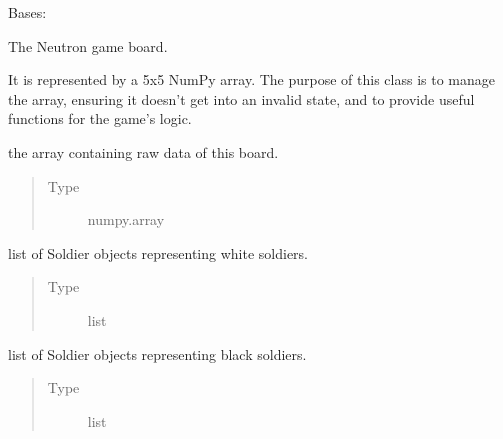 \documentclass[letterpaper,10pt,english]{sphinxmanual}
\begin{document}
\begin{fulllineitems}
\label{\detokenize{neutron:neutron.NeutronBoard}}
Bases: 

The Neutron game board.

It is represented by a 5x5 NumPy array. The purpose of this class is to
manage the array, ensuring it doesn’t get into an invalid state, and to
provide useful functions for the game’s logic.

\begin{fulllineitems}
\label{\detokenize{neutron:neutron.NeutronBoard.grid}}
the array containing raw data of this board.
\begin{quote}\begin{description}
\item[{Type}] \leavevmode
numpy.array

\end{description}\end{quote}

\end{fulllineitems}


\begin{fulllineitems}
\label{\detokenize{neutron:neutron.NeutronBoard.white_soldiers}}
list of Soldier objects representing white soldiers.
\begin{quote}\begin{description}
\item[{Type}] \leavevmode
list

\end{description}\end{quote}

\end{fulllineitems}


\begin{fulllineitems}
\label{\detokenize{neutron:neutron.NeutronBoard.black_soldiers}}
list of Soldier objects representing black soldiers.
\begin{quote}\begin{description}
\item[{Type}] \leavevmode
list


\end{description}
\end{quote}
\end{fulllineitems}
\end{fulllineitems}
\end{document}
